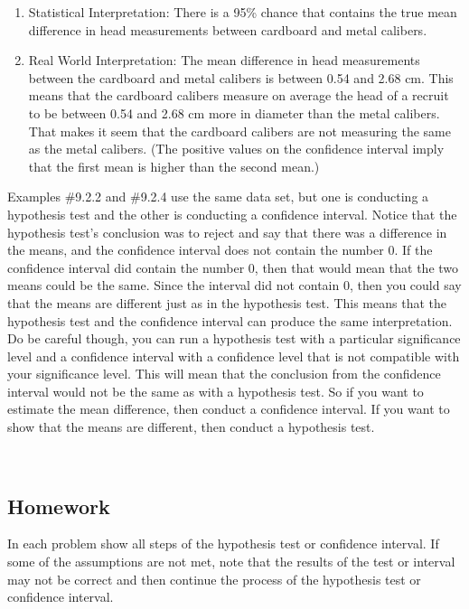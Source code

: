\documentclass[]{book}
\begin{document}
\begin{enumerate}
\def\labelenumi{\arabic{enumi}.}
\setcounter{enumi}{3}
\item
  Statistical Interpretation: There is a 95\% chance that contains the true mean difference in head measurements between cardboard and metal calibers.
\item
  Real World Interpretation: The mean difference in head measurements between the cardboard and metal calibers is between 0.54 and 2.68 cm. This means that the cardboard calibers measure on average the head of a recruit to be between 0.54 and 2.68 cm more in diameter than the metal calibers. That makes it seem that the cardboard calibers are not measuring the same as the metal calibers. (The positive values on the confidence interval imply that the first mean is higher than the second mean.)
\end{enumerate}

Examples \#9.2.2 and \#9.2.4 use the same data set, but one is conducting a hypothesis test and the other is conducting a confidence interval. Notice that the hypothesis test's conclusion was to reject and say that there was a difference in the means, and the confidence interval does not contain the number 0. If the confidence interval did contain the number 0, then that would mean that the two means could be the same. Since the interval did not contain 0, then you could say that the means are different just as in the hypothesis test. This means that the hypothesis test and the confidence interval can produce the same interpretation. Do be careful though, you can run a hypothesis test with a particular significance level and a confidence interval with a confidence level that is not compatible with your significance level. This will mean that the conclusion from the confidence interval would not be the same as with a hypothesis test. So if you want to estimate the mean difference, then conduct a confidence interval. If you want to show that the means are different, then conduct a hypothesis test.

\textbf{\\
}

\hypertarget{homework-27}{%
\subsection{Homework}\label{homework-27}}

In each problem show all steps of the hypothesis test or confidence interval. If some of the assumptions are not met, note that the results of the test or interval may not be correct and then continue the process of the hypothesis test or confidence interval.
\end{document}

